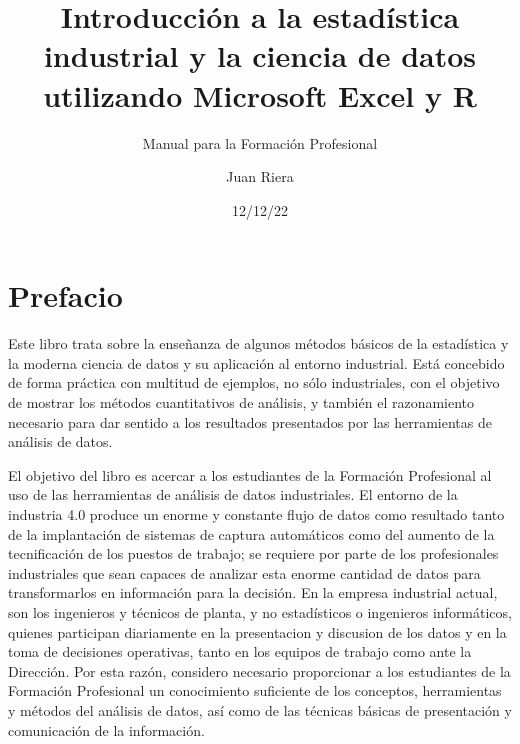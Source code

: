 \documentclass[
  letterpaper,
  DIV=11,
  numbers=noendperiod,
  oneside]{scrreprt}
\title{Introducción a la estadística industrial y la ciencia de datos
utilizando Microsoft Excel y R}
\subtitle{Manual para la Formación Profesional}
\author{Juan Riera}
\date{12/12/22}
\renewcommand*\contentsname{Tabla de contenidos}
\newcommand\contentsname{Tabla de contenidos}
\begin{document}
\maketitle
\ifdefined\Shaded\renewenvironment{Shaded}{\begin{tcolorbox}[frame hidden, boxrule=0pt, enhanced, interior hidden, borderline west={3pt}{0pt}{shadecolor}, sharp corners, breakable]}{\end{tcolorbox}}\fi

\renewcommand*\contentsname{Tabla de contenidos}
{
\hypersetup{linkcolor=}
\setcounter{tocdepth}{2}
\tableofcontents
}

\hypertarget{prefacio}{%
\chapter*{Prefacio}\label{prefacio}}


Este libro trata sobre la enseñanza de algunos métodos básicos de la
estadística y la moderna ciencia de datos y su aplicación al entorno
industrial. Está concebido de forma práctica con multitud de ejemplos,
no sólo industriales, con el objetivo de mostrar los métodos
cuantitativos de análisis, y también el razonamiento necesario para dar
sentido a los resultados presentados por las herramientas de análisis de
datos.

El objetivo del libro es acercar a los estudiantes de la Formación
Profesional al uso de las herramientas de análisis de datos
industriales. El entorno de la industria 4.0 produce un enorme y
constante flujo de datos como resultado tanto de la implantación de
sistemas de captura automáticos como del aumento de la tecnificación de
los puestos de trabajo; se requiere por parte de los profesionales
industriales que sean capaces de analizar esta enorme cantidad de datos
para transformarlos en información para la decisión. En la empresa
industrial actual, son los ingenieros y técnicos de planta, y no
estadísticos o ingenieros informáticos, quienes participan diariamente
en la presentacion y discusion de los datos y en la toma de decisiones
operativas, tanto en los equipos de trabajo como ante la Dirección. Por
esta razón, considero necesario proporcionar a los estudiantes de la
Formación Profesional un conocimiento suficiente de los conceptos,
herramientas y métodos del análisis de datos, así como de las técnicas
básicas de presentación y comunicación de la información.
\end{document}
